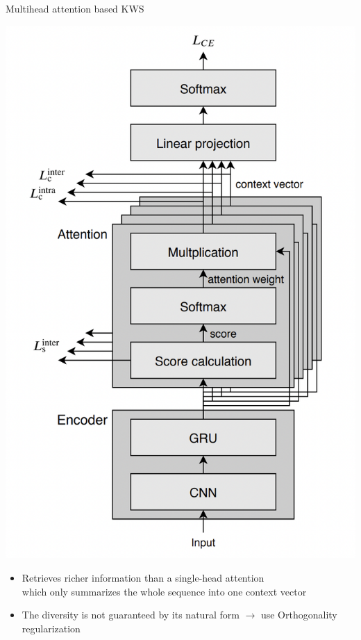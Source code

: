 \begin{frame}{Multihead attention based KWS}
\begin{minipage}{0.5\textwidth}%
    	\includegraphics[width=0.9\linewidth]{figs/multihead_attention_kws.png}
\end{minipage}%
\hfill%
\begin{minipage}{0.5\textwidth}
\begin{itemize}
    \item Retrieves richer information than a single-head attention \\ 
    which only summarizes the whole sequence into one context vector
    \item The diversity is not guaranteed by its natural form $\rightarrow$ use Orthogonality regularization
\end{itemize}
\end{minipage}



\end{frame}
